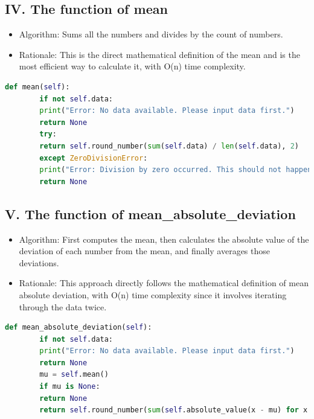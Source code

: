 \documentclass[english,12pt,a4paper]{report}
\begin{document}
	
	\subsection*{IV. The function of mean}
	\begin{itemize}[leftmargin=*]
		\item Algorithm: Sums all the numbers and divides by the count of numbers.
		\item Rationale: This is the direct mathematical definition of the mean and is the most efficient way to calculate it, with O(n) time complexity.
	\end{itemize}
	\begin{lstlisting}[language=Python, caption=Mean Method]
		def mean(self):
		if not self.data:
		print("Error: No data available. Please input data first.")
		return None
		try:
		return self.round_number(sum(self.data) / len(self.data), 2)
		except ZeroDivisionError:
		print("Error: Division by zero occurred. This should not happen.")
		return None
	\end{lstlisting}
	
	
	\subsection*{V. The function of mean\_absolute\_deviation}
	\begin{itemize}[leftmargin=*]
		\item Algorithm: First computes the mean, then calculates the absolute value of the deviation of each number from the mean, and finally averages those deviations.
		\item Rationale: This approach directly follows the mathematical definition of mean absolute deviation, with O(n) time complexity since it involves iterating through the data twice.
	\end{itemize}
	\begin{lstlisting}[language=Python, caption=Mean Absolute Deviation Method]
		def mean_absolute_deviation(self):
		if not self.data:
		print("Error: No data available. Please input data first.")
		return None
		mu = self.mean()
		if mu is None:
		return None
		return self.round_number(sum(self.absolute_value(x - mu) for x in self.data) / len(self.data), 2)
	\end{lstlisting}
	
	
\end{document}
